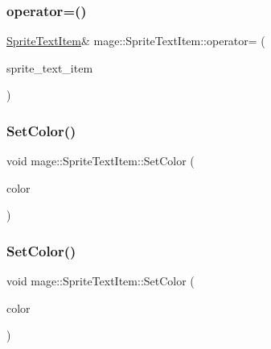 \hypertarget{structmage_1_1_sprite_text_item_aadbeeb0fb30b15675370f0b6eb65a9a2}{}\label{structmage_1_1_sprite_text_item_aadbeeb0fb30b15675370f0b6eb65a9a2} 
\subsubsection{\texorpdfstring{operator=()}{operator=()}\hspace{0.1cm}{\footnotesize\ttfamily [2/2]}}
{\footnotesize\ttfamily \hyperlink{structmage_1_1_sprite_text_item}{Sprite\+Text\+Item}\& mage\+::\+Sprite\+Text\+Item\+::operator= (\begin{DoxyParamCaption}\item[{\hyperlink{structmage_1_1_sprite_text_item}{Sprite\+Text\+Item} \&\&}]{sprite\+\_\+text\+\_\+item }\end{DoxyParamCaption})\hspace{0.3cm}{\ttfamily [default]}}

\hypertarget{structmage_1_1_sprite_text_item_ad5440a79f5f08d3fe8d4b58f69a88f3c}{}\label{structmage_1_1_sprite_text_item_ad5440a79f5f08d3fe8d4b58f69a88f3c} 
\subsubsection{\texorpdfstring{Set\+Color()}{SetColor()}\hspace{0.1cm}{\footnotesize\ttfamily [1/2]}}
{\footnotesize\ttfamily void mage\+::\+Sprite\+Text\+Item\+::\+Set\+Color (\begin{DoxyParamCaption}\item[{const \hyperlink{structmage_1_1_color}{Color} \&}]{color }\end{DoxyParamCaption})}

\hypertarget{structmage_1_1_sprite_text_item_a534551b3c7a135049984d19318004f82}{}\label{structmage_1_1_sprite_text_item_a534551b3c7a135049984d19318004f82} 
\subsubsection{\texorpdfstring{Set\+Color()}{SetColor()}\hspace{0.1cm}{\footnotesize\ttfamily [2/2]}}
{\footnotesize\ttfamily void mage\+::\+Sprite\+Text\+Item\+::\+Set\+Color (\begin{DoxyParamCaption}\item[{const X\+M\+V\+E\+C\+T\+OR \&}]{color }\end{DoxyParamCaption})}

